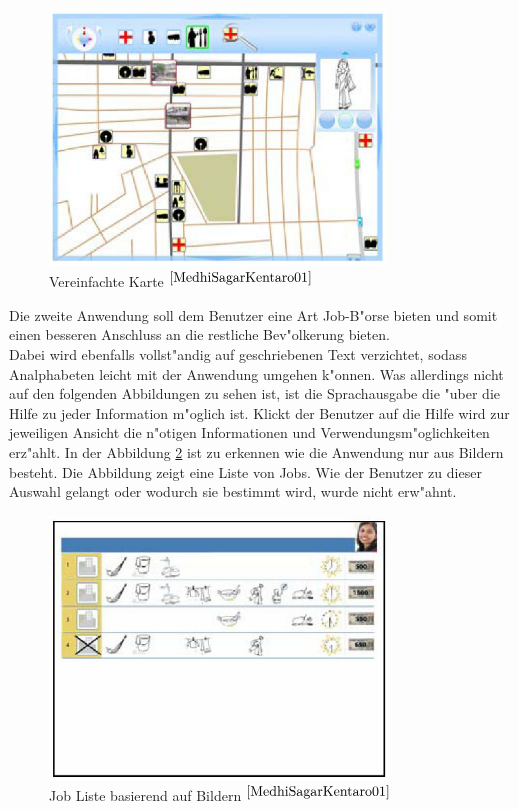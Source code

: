 \begin{figure}[h]
	\centering
		\includegraphics[width=0.8\textwidth]{Daten/map_simple.PNG}
	\caption{Vereinfachte Karte $^{\ref{MedhiSagarKentaro01}}$}
	\label{fig:mapsimple}
\end{figure}
Die zweite Anwendung soll dem Benutzer eine Art Job-B"orse bieten und somit einen besseren Anschluss an die restliche Bev"olkerung bieten.\\
Dabei wird ebenfalls vollst"andig auf geschriebenen Text verzichtet, sodass Analphabeten leicht mit der Anwendung umgehen k"onnen.
Was allerdings nicht auf den folgenden Abbildungen zu sehen ist, ist die Sprachausgabe die "uber die Hilfe zu jeder Information m"oglich ist. Klickt der Benutzer auf die Hilfe wird zur jeweiligen Ansicht die n"otigen Informationen und Verwendungsm"oglichkeiten erz"ahlt.
In der Abbildung \ref{fig:joblist} ist zu erkennen wie die Anwendung nur aus Bildern besteht. Die Abbildung zeigt eine Liste von Jobs. Wie der Benutzer zu dieser Auswahl gelangt oder wodurch sie bestimmt wird, wurde nicht erw"ahnt.\\
\begin{figure}[h]
	\centering
		\includegraphics[width=0.80\textwidth]{Daten/job_list.PNG}
	\caption{Job Liste basierend auf Bildern $^{\ref{MedhiSagarKentaro01}}$}
	\label{fig:joblist}
\end{figure}
